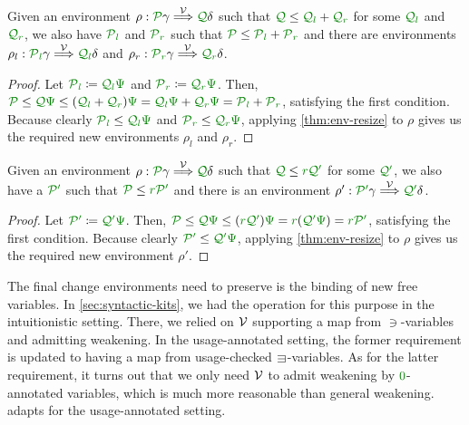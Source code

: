 \begin{lemma}\label{thm:lr-env-add}
  Given an environment $\rho : \grP\gamma \env\V \grQ\delta$ such that
  $\grQ \leq \grQl + \grQr$ for some $\grQl$ and $\grQr$, we also have $\grPl$
  and $\grPr$ such that $\grP \leq \grPl + \grPr$ and there are environments
  $\rho_l : \grPl\gamma \env\V \grQl\delta$ and
  $\rho_r : \grPr\gamma \env\V \grQr\delta$.
\end{lemma}
\begin{proof}
  Let $\grPl \coloneqq \grQl\gr\Psi$ and $\grPr \coloneqq \grQr\gr\Psi$.
  Then, $\grP \leq \grQ\gr\Psi \leq \plr{\grQl + \grQr}\gr\Psi =
  \grQl\gr\Psi + \grQr\gr\Psi = \grPl + \grPr$, satisfying the first condition.
  Because clearly $\grPl \leq \grQl\gr\Psi$ and $\grPr \leq \grQr\gr\Psi$,
  applying \cref{thm:env-resize} to $\rho$ gives us the required
  new environments $\rho_l$ and $\rho_r$.
\end{proof}

\begin{lemma}\label{thm:lr-env-scale}
  Given an environment $\rho : \grP\gamma \env\V \grQ\delta$ such that
  $\grQ \leq \gr r\grQprime$ for some $\grQprime$, we also have a $\grPprime$
  such that $\grP \leq \gr r\grPprime$ and there is an environment
  $\rho' : \grPprime\gamma \env\V \grQprime\delta$.
\end{lemma}
\begin{proof}
  Let $\grPprime \coloneqq \grQprime\gr\Psi$.
  Then, $\grP \leq \grQ\gr\Psi \leq \plr{\gr r\grQprime}\gr\Psi =
  \gr r\plr{\grQprime\gr\Psi} = \gr r\grPprime$, satisfying the first condition.
  Because clearly $\grPprime \leq \grQprime\gr\Psi$,
  applying \cref{thm:env-resize} to $\rho$ gives us the required
  new environment $\rho'$.
\end{proof}

The final change environments need to preserve is the binding of new free
variables.
In \cref{sec:syntactic-kits}, we had the operation  for
this purpose in the intuitionistic setting.
There, we relied on $\mathcal V$ supporting a map from $\ni$-variables and admitting
weakening.
In the usage-annotated setting, the former requirement is updated to having a
map from usage-checked $\sqni$-variables.
As for the latter requirement, it turns out that we only need $\mathcal V$ to admit
weakening by $\gr0$-annotated variables, which is much more reasonable than
general weakening.
 adapts  for the usage-annotated
setting.

